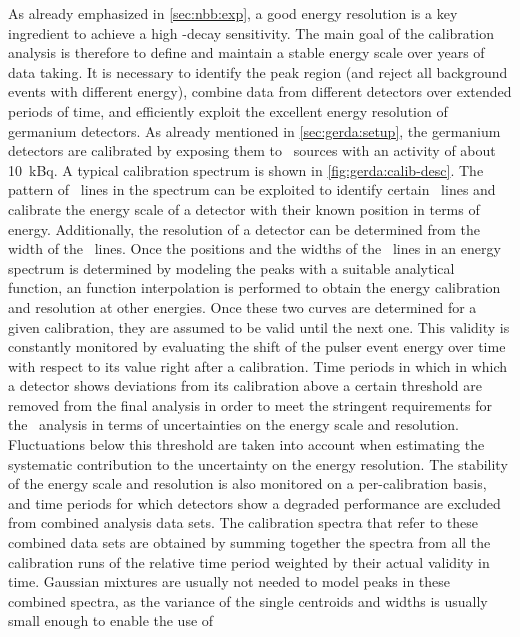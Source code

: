 As already emphasized in \cref{sec:nbb:exp}, a good energy resolution is a key ingredient
to achieve a high \onbb-decay sensitivity. The main goal of the calibration analysis is
therefore to define and maintain a stable energy scale over years of data taking.  It
is necessary to identify the peak region (and reject all background events with
different energy), combine data from different detectors over extended periods of time,
and efficiently exploit the excellent energy resolution of germanium detectors.
\newpar
As already mentioned in \cref{sec:gerda:setup}, the germanium detectors are calibrated by
exposing them to \Th\ sources with an activity of about 10~kBq. A typical calibration
spectrum is shown in \cref{fig:gerda:calib-desc}. The pattern of \g\ lines in the spectrum
can be exploited to identify certain \g\ lines and calibrate the energy scale of a
detector with their known position in terms of energy.  Additionally, the resolution of a
detector can be determined from the width of the \g\ lines. Once the positions and the
widths of the \g\ lines in an energy spectrum is determined by modeling the peaks with a
suitable analytical function, an function interpolation is performed to obtain the energy
calibration and resolution at other energies. Once these two curves are determined for a
given calibration, they are assumed to be valid until the next one. This validity is
constantly monitored by evaluating the shift of the pulser event energy over time with
respect to its value right after a calibration. Time periods in which in which a detector
shows deviations from its calibration above a certain threshold are removed from the final
analysis in order to meet the stringent requirements for the \onbb\ analysis in terms of
uncertainties on the energy scale and resolution. Fluctuations below this threshold are
taken into account when estimating the systematic contribution to the uncertainty on the
energy resolution. The stability of the energy scale and resolution is also monitored on a
per-calibration basis, and time periods for which detectors show a degraded performance
are excluded from combined analysis data sets.  The calibration spectra that refer to
these combined data sets are obtained by summing together the spectra from all the
calibration runs of the relative time period weighted by their actual validity in time.
Gaussian mixtures are usually not needed to model peaks in these combined spectra, as the
variance of the single centroids and widths is usually small enough to enable the use of
